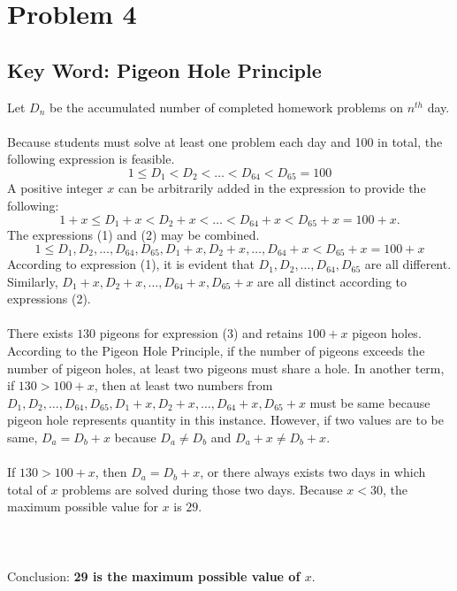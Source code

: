 \documentclass[12pt]{report}
\begin{document}
\chapter*{Problem 4}
\section*{Key Word: Pigeon Hole Principle}
Let $D_n$ be the accumulated number of completed homework problems on $n^{th}$ day.
\\\\
Because students must solve at least one problem each day and 100 in total, the following expression is feasible.
\begin{equation}
1\le D_1 < D_2 < \dots < D_{64} < D_{65} = 100
\end{equation}
A positive integer $x$ can be arbitrarily added in the expression to provide the following:
\begin{equation}
1+x\le D_1 +x < D_2 +x < \dots < D_{64}+x < D_{65}+x = 100+x.
\end{equation}
The expressions (1) and (2) may be combined.
\begin{equation}
1\le D_1, D_2, \dots, D_{64}, D_{65}, D_1 +x, D_2 +x, \dots, D_{64}+x < D_{65}+x = 100+x
\end{equation}
According to expression (1), it is evident that $D_1, D_2, \dots, D_{64}, D_{65}$ are all different. Similarly, $D_1 +x, D_2 +x, \dots, D_{64}+x, D_{65}+x$ are all distinct according to expressions (2).
\\\\
There exists $130$ pigeons for expression (3) and retains $100+x$ pigeon holes. According to the Pigeon Hole Principle, if the number of pigeons exceeds the number of pigeon holes, at least two pigeons must share a hole. In another term, if $130>100+x$, then at least two numbers from $D_1, D_2, \dots, D_{64}, D_{65}, D_1 +x, D_2 +x, \dots, D_{64}+x, D_{65}+x$ must be same because pigeon hole represents quantity in this instance. However, if two values are to be same, $D_a=D_b+x$ because $D_a\ne D_b$ and $D_a+x \ne D_b+x$.
\\\\
If $130>100+x$, then $D_a=D_b+x$, or there always exists two days in which total of $x$ problems are solved during those two days. Because $x<30$, the maximum possible value for $x$ is $29$.
\\\\
\\\\
Conclusion: \textbf{29 is the maximum possible value of $x$}.
\end{document}
